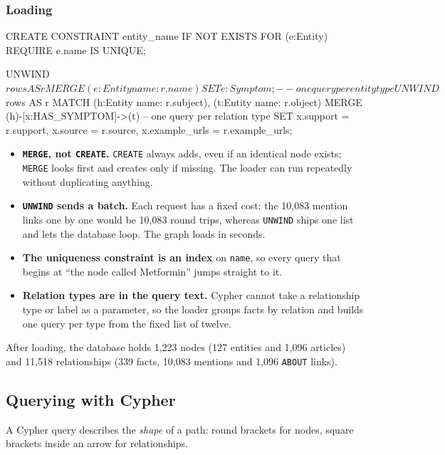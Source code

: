 \documentclass[11pt, a4paper]{article}
\newcommand{\code}[1]{\texttt{#1}}
\begin{document}
\subsubsection{Loading}

\begin{codeblock}
CREATE CONSTRAINT entity_name IF NOT EXISTS FOR (e:Entity) REQUIRE e.name IS UNIQUE;

UNWIND $rows AS r
MERGE (e:Entity {name: r.name}) SET e:Symptom;          -- one query per entity type

UNWIND $rows AS r
MATCH (h:Entity {name: r.subject}), (t:Entity {name: r.object})
MERGE (h)-[x:HAS_SYMPTOM]->(t)                           -- one query per relation type
SET x.support = r.support, x.source = r.source, x.example_urls = r.example_urls;
\end{codeblock}

\begin{itemize}
    \item \textbf{\code{MERGE}, not \code{CREATE}.} \code{CREATE} always adds, even if an identical node exists; \code{MERGE} looks first and creates only if missing. The loader can run repeatedly without duplicating anything.
    \item \textbf{\code{UNWIND} sends a batch.} Each request has a fixed cost: the 10,083 mention links one by one would be 10,083 round trips, whereas \code{UNWIND} ships one list and lets the database loop. The graph loads in seconds.
    \item \textbf{The uniqueness constraint is an index} on \code{name}, so every query that begins at ``the node called Metformin'' jumps straight to it.
    \item \textbf{Relation types are in the query text.} Cypher cannot take a relationship type or label as a parameter, so the loader groups facts by relation and builds one query per type from the fixed list of twelve.
\end{itemize}

After loading, the database holds 1,223 nodes (127 entities and 1,096 articles) and 11,518 relationships (339 facts, 10,083 mentions and 1,096 \code{ABOUT} links).

\subsection{Querying with Cypher}

A Cypher query describes the \emph{shape} of a path: round brackets for nodes, square brackets inside an arrow for relationships.
\end{document}
